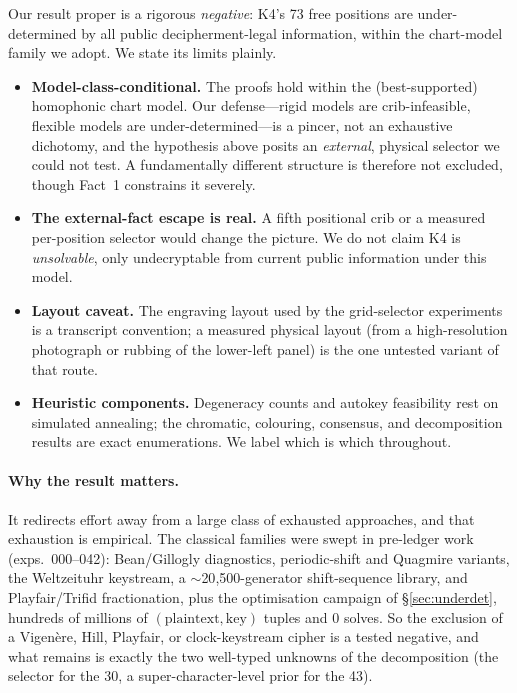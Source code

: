 \documentclass[11pt]{article}
\theoremstyle{plain}
\theoremstyle{definition}
\newcommand{\K}{\textsf{K4}}
\begin{document}
Our result proper is a rigorous \emph{negative}: \K{}'s 73 free positions are
under-determined by all public decipherment-legal information, within the chart-model
family we adopt. We state its limits plainly.
\begin{itemize}[leftmargin=1.4em,itemsep=2pt]
\item \textbf{Model-class-conditional.} The proofs hold within the (best-supported)
homophonic chart model. Our defense---rigid models are crib-infeasible, flexible
models are under-determined---is a pincer, not an exhaustive dichotomy, and the
hypothesis above posits an \emph{external}, physical selector we could not test. A
fundamentally different structure is therefore not excluded, though Fact~1 constrains
it severely.
\item \textbf{The external-fact escape is real.} A fifth positional crib or a
measured per-position selector would change the picture. We do not claim \K{} is
\emph{unsolvable}, only undecryptable from current public information under this
model.
\item \textbf{Layout caveat.} The engraving layout used by the grid-selector
experiments is a transcript convention; a measured physical layout (from a
high-resolution photograph or rubbing of the lower-left panel) is the one untested
variant of that route.
\item \textbf{Heuristic components.} Degeneracy counts and autokey feasibility rest
on simulated annealing; the chromatic, colouring, consensus, and decomposition
results are exact enumerations. We label which is which throughout.
\end{itemize}

\paragraph{Why the result matters.} It redirects effort away from a large class of
exhausted approaches, and that exhaustion is empirical. The
classical families were swept in pre-ledger work (exps.~000--042): Bean/Gillogly
diagnostics, periodic-shift and Quagmire variants, the Weltzeituhr keystream, a
$\sim$20{,}500-generator shift-sequence library, and Playfair/Trifid fractionation,
plus the optimisation campaign of \S\ref{sec:underdet}, hundreds of millions of
$(\text{plaintext},\text{key})$ tuples and $0$ solves. So the exclusion of a
Vigen\`ere, Hill, Playfair, or clock-keystream cipher is a tested negative, and what
remains is exactly the two well-typed unknowns of the decomposition (the selector for
the 30, a super-character-level prior for the 43).
\end{document}
